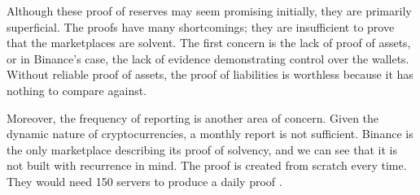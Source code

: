 Although these proof of reserves may seem promising initially, they are primarily superficial.
The proofs have many shortcomings; they are insufficient to prove that the marketplaces are solvent.
The first concern is the lack of proof of assets, or in Binance's case, the lack of evidence demonstrating control over the wallets.
Without reliable proof of assets, the proof of liabilities is worthless because it has nothing to compare against.

Moreover, the frequency of reporting is another area of concern. Given the dynamic nature of cryptocurrencies, a monthly report is not sufficient.
Binance is the only marketplace describing its proof of solvency, and we can see that it is not built with recurrence in mind.
The proof is created from scratch every time. They would need 150 servers to produce a daily proof \cite{BPS}.


